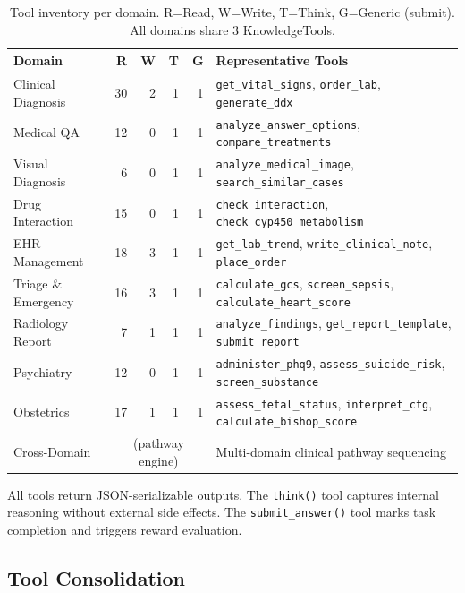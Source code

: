 \documentclass{article}
\begin{document}
\begin{table}[h]
\centering
\caption{Tool inventory per domain. R=Read, W=Write, T=Think, G=Generic (submit). All domains share 3 KnowledgeTools.}
\label{tab:tool_inventory}
\small
\begin{tabular}{lrrrrl}
\toprule
\textbf{Domain} & \textbf{R} & \textbf{W} & \textbf{T} & \textbf{G} & \textbf{Representative Tools} \\
\midrule
Clinical Diagnosis & 30 & 2 & 1 & 1 & \texttt{get\_vital\_signs}, \texttt{order\_lab}, \texttt{generate\_ddx} \\
Medical QA & 12 & 0 & 1 & 1 & \texttt{analyze\_answer\_options}, \texttt{compare\_treatments} \\
Visual Diagnosis & 6 & 0 & 1 & 1 & \texttt{analyze\_medical\_image}, \texttt{search\_similar\_cases} \\
Drug Interaction & 15 & 0 & 1 & 1 & \texttt{check\_interaction}, \texttt{check\_cyp450\_metabolism} \\
EHR Management & 18 & 3 & 1 & 1 & \texttt{get\_lab\_trend}, \texttt{write\_clinical\_note}, \texttt{place\_order} \\
Triage \& Emergency & 16 & 3 & 1 & 1 & \texttt{calculate\_gcs}, \texttt{screen\_sepsis}, \texttt{calculate\_heart\_score} \\
Radiology Report & 7 & 1 & 1 & 1 & \texttt{analyze\_findings}, \texttt{get\_report\_template}, \texttt{submit\_report} \\
Psychiatry & 12 & 0 & 1 & 1 & \texttt{administer\_phq9}, \texttt{assess\_suicide\_risk}, \texttt{screen\_substance} \\
Obstetrics & 17 & 1 & 1 & 1 & \texttt{assess\_fetal\_status}, \texttt{interpret\_ctg}, \texttt{calculate\_bishop\_score} \\
Cross-Domain & \multicolumn{4}{c}{(pathway engine)} & Multi-domain clinical pathway sequencing \\
\bottomrule
\end{tabular}
\end{table}

All tools return JSON-serializable outputs. The \texttt{think()} tool captures internal reasoning without external side effects. The \texttt{submit\_answer()} tool marks task completion and triggers reward evaluation.

\subsection{Tool Consolidation}
\label{app:tool_consolidation}
\end{document}
